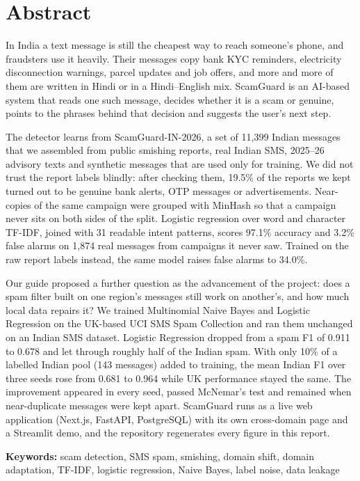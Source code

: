 \chapter*{\centering Abstract}
In India a text message is still the cheapest way to reach someone's phone, and fraudsters use it heavily. Their messages copy bank KYC reminders, electricity disconnection warnings, parcel updates and job offers, and more and more of them are written in Hindi or in a Hindi--English mix. ScamGuard is an AI-based system that reads one such message, decides whether it is a scam or genuine, points to the phrases behind that decision and suggests the user's next step.

The detector learns from ScamGuard-IN-2026, a set of 11,399 Indian messages that we assembled from public smishing reports, real Indian SMS, 2025--26 advisory texts and synthetic messages that are used only for training. We did not trust the report labels blindly: after checking them, 19.5\% of the reports we kept turned out to be genuine bank alerts, OTP messages or advertisements. Near-copies of the same campaign were grouped with MinHash so that a campaign never sits on both sides of the split. Logistic regression over word and character TF-IDF, joined with 31 readable intent patterns, scores 97.1\% accuracy and 3.2\% false alarms on 1,874 real messages from campaigns it never saw. Trained on the raw report labels instead, the same model raises false alarms to 34.0\%.

Our guide proposed a further question as the advancement of the project: does a spam filter built on one region's messages still work on another's, and how much local data repairs it? We trained Multinomial Naive Bayes and Logistic Regression on the UK-based UCI SMS Spam Collection and ran them unchanged on an Indian SMS dataset. Logistic Regression dropped from a spam F1 of 0.911 to 0.678 and let through roughly half of the Indian spam. With only 10\% of a labelled Indian pool (143 messages) added to training, the mean Indian F1 over three seeds rose from 0.681 to 0.964 while UK performance stayed the same. The improvement appeared in every seed, passed McNemar's test and remained when near-duplicate messages were kept apart. ScamGuard runs as a live web application (Next.js, FastAPI, PostgreSQL) with its own cross-domain page and a Streamlit demo, and the repository regenerates every figure in this report.

\vspace{0.4cm}\noindent\textbf{Keywords:} scam detection, SMS spam, smishing, domain shift, domain adaptation, TF-IDF, logistic regression, Naive Bayes, label noise, data leakage
\clearpage
\renewcommand{\contentsname}{\centering Contents}
\tableofcontents
\clearpage
